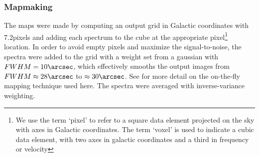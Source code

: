 % 
% 


\subsubsection{Mapmaking}
The maps were made by computing an output grid in Galactic coordinates with
7.2\arcsec pixels and adding each spectrum to the cube at the appropriate
pixel\footnote{We use the term `pixel' to refer to a square data element
projected on the sky with axes in Galactic coordinates.  The term `voxel' is
used to indicate a cubic data element, with two axes in galactic coordinates
and a third in frequency or velocity} location.  In order
to avoid empty pixels and maximize the signal-to-noise, the spectra were added
to the grid with a weight set from a gaussian with $FWHM=10\arcsec$, which
effectively smooths the output images from $FWHM\approx28\arcsec$ to
$\approx30\arcsec$.  See \citet{Mangum2007a} for more detail on the on-the-fly
mapping technique used here.  The spectra were averaged with inverse-variance
weighting.


